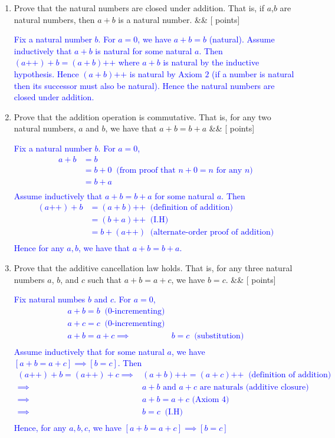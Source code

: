 \documentclass[12pt]{article}
\newcommand{\points}[1]{\hfill {[#1 points]}}
\newcommand{\problem}[2][]{%
  \item {#2}%
  \ifx&#1&%
  \else%
    \points{#1}%
  \fi
  \par\vspace{0.5em}
}
\begin{document}
\begin{enumerate}[leftmargin=*, label=\textbf{\arabic*.}]
	
	 \problem{Prove that the natural numbers are closed under addition. That is, if $a$,$b$ are natural numbers, then $a+b$ is a natural number.}
    	\textcolor{blue}{Fix a natural number $b$. For $a = 0$, we have $a + b = b$ (natural). Assume inductively that $a+b$ is natural for some natural $a$. Then $(a\text{++}) + b = (a+b)\text{++}$ where $a+b$ is natural by the inductive hypothesis. Hence $(a+b)\text{++}$ is natural by Axiom $2$ (if a number is natural then its successor must also be natural). Hence the natural numbers are closed under addition.}
	
	 \problem{Prove that the addition operation is commutative. That is, for any two natural numbers, $a$ and $b$, we have that $a+b = b+a$}
    	\textcolor{blue}{Fix a natural number $b$. For $a=0$, 
	\begin{align*}
	a + b &= b \\
	&= b + 0 \;\; \text{(from proof that $n+0=n$ for any $n$)} \\
	&= b + a \\
	\end{align*}
	Assume inductively that $a + b = b + a$ for some natural $a$. Then
	\begin{align*}
	(a\text{++}) + b &= (a + b)\text{++} \;\; \text{(definition of addition)} \\
	&= (b + a)\text{++} \;\; \text{(I.H)} \\
	&= b+(a\text{++}) \;\; \text{(alternate-order proof of addition)} \\
	\end{align*}
	Hence for any $a,b$, we have that $a + b = b + a$.}
	
	
	\problem{Prove that the additive cancellation law holds. That is, for any three natural numbers $a$, $b$, and $c$ such that $a + b = a + c$, we have $b = c$.}
    	\textcolor{blue}{Fix natural numbes $b$ and $c$. For $a=0$, 
	\begin{align*}
	a+b = b \;\; \text{($0$-incrementing)} \\
	a+c = c \;\; \text{($0$-incrementing)} \\
	a+b=a+c \implies& b = c \;\; \text{(substitution)}\\
	\end{align*}
	Assume inductively that for some natural $a$, we have $[a+b=a+c] \implies [b=c]$. Then
	\begin{align*}
	(a\text{++})+b=(a\text{++})+c \implies& (a+b)\text{++} = (a+c)\text{++} \;\; \text{(definition of addition)} \\
	\implies& \text{$a + b$ and $a + c$ are naturals (additive closure)} \\
	\implies& \text{$a + b = a + c$ (Axiom $4$)} \\
	\implies& b = c \;\; \text{(I.H)} \\
	\end{align*}
	Hence, for any $a,b,c$, we have $[a + b = a + c] \implies [b = c]$}
	

\end{enumerate}
\end{document}
